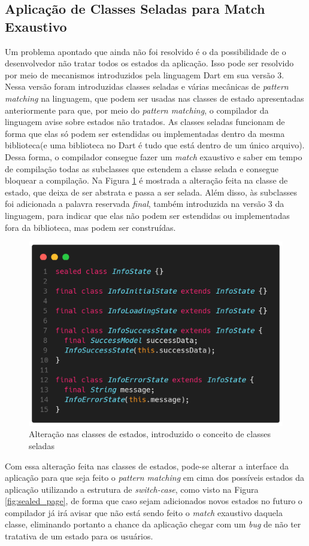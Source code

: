\documentclass[12pt, %
openright, 
oneside, %
a4paper,    %
brazil]{facom-ufu-abntex2}
\begin{document}
\subsection{Aplicação de Classes Seladas para Match Exaustivo}

Um problema apontado que ainda não foi resolvido é o da possibilidade de o desenvolvedor não tratar todos os estados da aplicação. Isso pode ser resolvido por meio de mecanismos introduzidos pela linguagem Dart em sua versão 3. Nessa versão foram introduzidas classes seladas e várias mecânicas de \textit{pattern matching} na linguagem, que podem ser usadas nas classes de estado apresentadas anteriormente para que, por meio do \textit{pattern matching}, o compilador da linguagem avise sobre estados não tratados. As classes seladas funcionam de forma que elas só podem ser estendidas ou implementadas dentro da mesma biblioteca(e uma biblioteca no Dart é tudo que está dentro de um único arquivo). Dessa forma, o compilador consegue fazer um \textit{match} exaustivo e saber em tempo de compilação todas as subclasses que estendem a classe selada e consegue bloquear a compilação. Na Figura \ref{fig:sealed_states} é mostrada a alteração feita na classe de estado, que deixa de ser abstrata e passa a ser selada. Além disso, às subclasses foi adicionada a palavra reservada \textit{final}, também introduzida na versão 3 da linguagem, para indicar que elas não podem ser estendidas ou implementadas fora da biblioteca, mas podem ser construídas.

\begin{figure}[ht]
    \centering
    \includegraphics[width=.65\textwidth, trim={0 30 0 100}, clip]{figures/states/sealed_states.png}
    \caption{Alteração nas classes de estados, introduzido o conceito de classes seladas}
    \label{fig:sealed_states}
\end{figure}

Com essa alteração feita nas classes de estados, pode-se alterar a interface da aplicação para que seja feito o \textit{pattern matching} em cima dos possíveis estados da aplicação utilizando a estrutura de \textit{switch-case}, como visto na Figura \ref{fig:sealed_page}, de forma que caso sejam adicionados novos estados no futuro o compilador já irá avisar que não está sendo feito o \textit{match} exaustivo daquela classe, eliminando portanto a chance da aplicação chegar com um \textit{bug} de não ter tratativa de um estado para os usuários.
\end{document}
